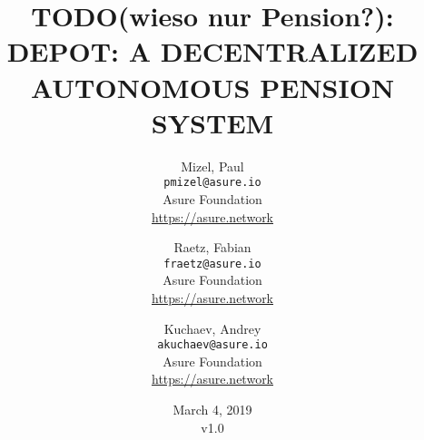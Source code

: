 
\title{TODO(wieso nur Pension?): DEPOT: A DECENTRALIZED AUTONOMOUS PENSION SYSTEM}
\author{
  Mizel, Paul\\
  \texttt{pmizel@asure.io}\\
  Asure Foundation \\ 
  {\url{https://asure.network}}\\
  \and
  Raetz, Fabian\\
  \texttt{fraetz@asure.io}\\
  Asure Foundation \\ 
  {\url{https://asure.network}}\\
  \and
  Kuchaev, Andrey\\
  \texttt{akuchaev@asure.io}\\
  Asure Foundation \\ 
  {\url{https://asure.network}}\\
}

\date{March 4, 2019\\v1.0}
\maketitle

